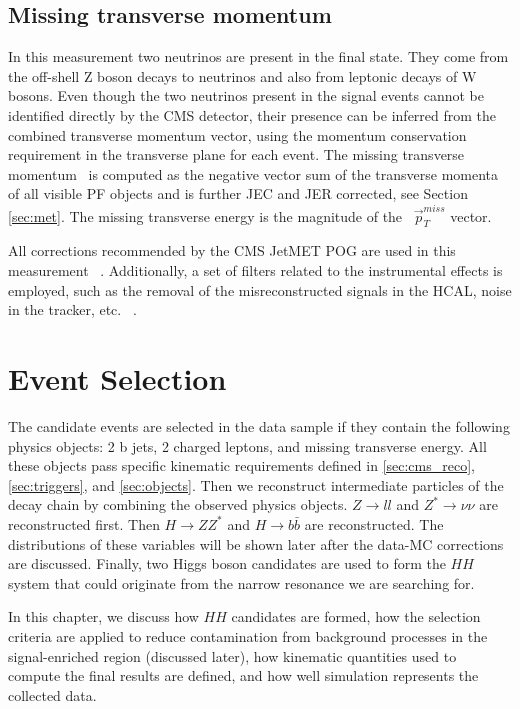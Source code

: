 \subsection{Missing transverse momentum}
In this measurement two neutrinos are present in the final state. They come from the off-shell Z boson decays to neutrinos and also from leptonic decays of W bosons. Even though the two neutrinos present in the signal events cannot be identified directly by the CMS detector, their presence can be inferred from the combined transverse momentum vector, using the momentum conservation requirement in the transverse plane for each event. The missing transverse momentum ~\PTslash is computed as the negative vector sum of the transverse momenta of all visible PF objects and is further JEC and JER corrected, see Section \ref{sec:met}. The missing transverse energy \ETslash is the magnitude of the ~$\vec{p}^{miss}_T$ vector. 

All corrections recommended by the CMS JetMET POG are used in this measurement ~\cite{MissingETRun2Corrections}. Additionally, a set of filters related to the instrumental effects is employed, such as the removal of the misreconstructed signals in the HCAL, noise in the tracker, etc. ~\cite{MissingETOptionalFiltersRun2}. 

\section{Event Selection}\label{sec:selection}

The candidate events are selected in the data sample if they contain the following physics objects: 2 b jets, 2 charged leptons, and missing transverse energy. All these objects pass specific kinematic requirements defined in \ref{sec:cms_reco}, \ref{sec:triggers}, and \ref{sec:objects}. Then we reconstruct intermediate particles of the decay chain by combining the observed physics objects. $Z \to ll$ and $Z^* \to \nu \nu$ are reconstructed first. Then $H \to ZZ^*$ and $H \to b\bar{b}$ are reconstructed. The distributions of these variables will be shown later after the data-MC corrections are discussed. Finally, two Higgs boson candidates are used to form the $HH$ system that could originate from the narrow resonance we are searching for.

In this chapter, we discuss how $HH$ candidates are formed, how the selection criteria are applied to reduce contamination from background processes in the signal-enriched region (discussed later), how kinematic quantities used to compute the final results are defined, and how well simulation represents the collected data.

